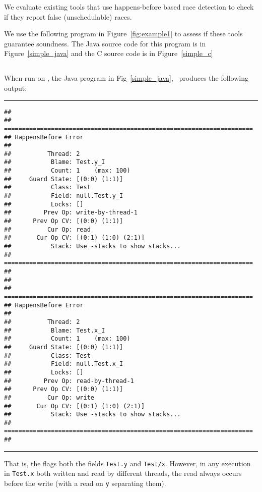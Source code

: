 
We evaluate existing tools that
use happens-before based race detection to
check if they report false (unschedulable) races.

We use the following program in Figure~\ref{fig:example1} to assess if these
tools guarantee soundness.
The Java source code for this program is in Figure~\ref{simple_java}
and the C source code is in Figure~\ref{simple_c}



\subsection{\fasttrack}

When run on \fasttrack, the Java program in Fig~\ref{simple_java}, \fasttrack~produces
the following output:

\vspace{0.5cm}
\hrule
{\small
\begin{verbatim}
## 
## =====================================================================
## HappensBefore Error
## 
##          Thread: 2    
##           Blame: Test.y_I
##           Count: 1    (max: 100)
##     Guard State: [(0:0) (1:1)]
##           Class: Test
##           Field: null.Test.y_I
##           Locks: []
##         Prev Op: write-by-thread-1
##      Prev Op CV: [(0:0) (1:1)]
##          Cur Op: read
##       Cur Op CV: [(0:1) (1:0) (2:1)]
##           Stack: Use -stacks to show stacks...
## =====================================================================
## 
## 
## =====================================================================
## HappensBefore Error
## 
##          Thread: 2    
##           Blame: Test.x_I
##           Count: 1    (max: 100)
##     Guard State: [(0:0) (1:1)]
##           Class: Test
##           Field: null.Test.x_I
##           Locks: []
##         Prev Op: read-by-thread-1
##      Prev Op CV: [(0:0) (1:1)]
##          Cur Op: write
##       Cur Op CV: [(0:1) (1:0) (2:1)]
##           Stack: Use -stacks to show stacks...
## =====================================================================
## 
\end{verbatim}
}
\hrule
\vspace{0.5cm}

That is, the flags both the fields \texttt{Test.y} and \texttt{Test/x}.
However, in any execution in \texttt{Test.x} both written and read by different threads,
the read always occurs before the write (with a read on \texttt{y} separating them).

